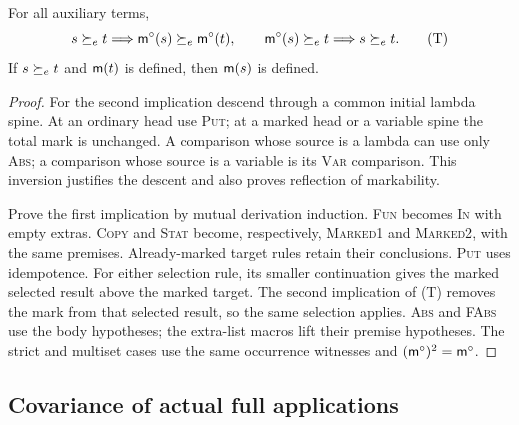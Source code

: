 \begin{lemma}\label{lem:extended-marking}
For all auxiliary terms,
\[
 s\succeq_e t\Longrightarrow\mathsf m^\circ(s)\succeq_e \mathsf m^\circ(t),\qquad
 \mathsf m^\circ(s)\succeq_e t\Longrightarrow s\succeq_e t.
 \tag{T}
\]
If $s\succeq_e t$ and $\mathsf m(t)$ is defined, then $\mathsf m(s)$ is defined.
\end{lemma}
\begin{proof}
For the second implication descend through a common
initial lambda spine. At an ordinary head use
\textsc{Put}; at a marked head or a variable spine
the total mark is unchanged. A comparison whose source
is a lambda can use only \textsc{Abs}; a comparison
whose source is a variable is its \textsc{Var}
comparison. This inversion justifies the descent and
also proves reflection of markability.

Prove the first implication by mutual derivation
induction. \textsc{Fun} becomes \textsc{In} with empty
extras. \textsc{Copy} and \textsc{Stat} become,
respectively, \textsc{Marked1} and \textsc{Marked2},
with the same premises. Already-marked target rules
retain their conclusions. \textsc{Put} uses
idempotence. For either selection rule, its smaller
continuation gives the marked selected result above
the marked target. The second implication of (T)
removes the mark from that selected result, so the
same selection applies. \textsc{Abs} and
\textsc{FAbs} use the body hypotheses; the extra-list
macros lift their premise hypotheses. The strict and
multiset cases use the same occurrence witnesses
and $(\mathsf m^\circ)^2=\mathsf m^\circ$.
\end{proof}

\subsection{Covariance of actual full applications}


